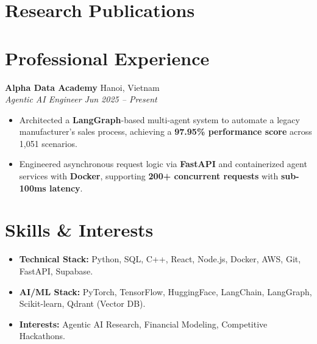 \documentclass[10pt, letterpaper]{article}
\newcommand{\entryheader}[4]{
    \noindent\textbf{#1} \hfill #2 \\
    \textit{#3} \hfill \textit{#4} \par
}
\begin{document}
\section{Research Publications}
\nocite{*}
\printbibliography[heading=subbibliography, title={Conference Proceedings}, type=inproceedings]

\section{Professional Experience}
\entryheader{Alpha Data Academy}{Hanoi, Vietnam}{Agentic AI Engineer}{Jun 2025 -- Present}
\begin{itemize}
    \item Architected a \textbf{LangGraph}-based multi-agent system to automate a legacy manufacturer's sales process, achieving a \textbf{97.95\% performance score} across 1,051 scenarios.
    \item Engineered asynchronous request logic via \textbf{FastAPI} and containerized agent services with \textbf{Docker}, supporting \textbf{200+ concurrent requests} with \textbf{sub-100ms latency}.
\end{itemize}

\section{Skills \& Interests}
\begin{itemize}
    \item \textbf{Technical Stack:} Python, SQL, C++, React, Node.js, Docker, AWS, Git, FastAPI, Supabase.
    \item \textbf{AI/ML Stack:} PyTorch, TensorFlow, HuggingFace, LangChain, LangGraph, Scikit-learn, Qdrant (Vector DB).
    \item \textbf{Interests:} Agentic AI Research, Financial Modeling, Competitive Hackathons.
\end{itemize}
\end{document}
